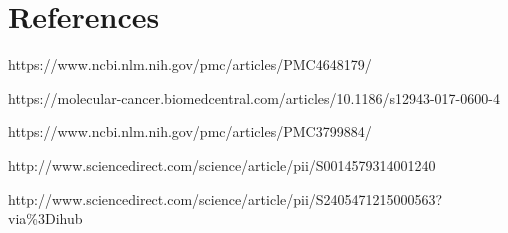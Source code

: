 \documentclass[12pt]{article}
\begin{document}
\section{References}
https://www.ncbi.nlm.nih.gov/pmc/articles/PMC4648179/

https://molecular-cancer.biomedcentral.com/articles/10.1186/s12943-017-0600-4

https://www.ncbi.nlm.nih.gov/pmc/articles/PMC3799884/

http://www.sciencedirect.com/science/article/pii/S0014579314001240

http://www.sciencedirect.com/science/article/pii/S2405471215000563?via\%3Dihub
\end{document}
